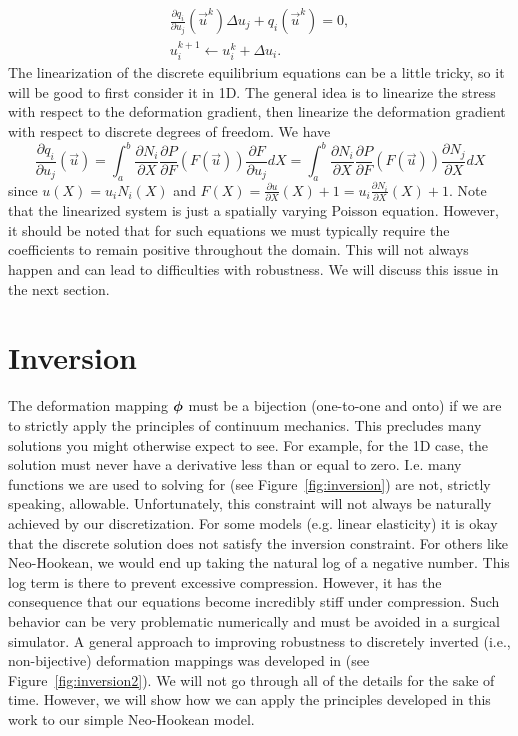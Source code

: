 \begin{gather*}
\frac{\partial q_i}{\partial u_j} \left( \vec{u}^k \right) \Delta{u}_j + q_i \left( \vec{u}^k \right) = 0, \\
u_i^{k+1} \leftarrow u_i^{k} + \Delta{u}_i.
\end{gather*}
The linearization of the discrete equilibrium equations can be a little tricky, so it will be good to first consider it in 1D. The general idea is to linearize the stress with respect to the deformation gradient, then linearize the deformation gradient with respect to discrete degrees of freedom. We have
\begin{equation*}
\frac{\partial q_i}{\partial u_j} \left( \vec{u} \right) = \int_a^b \frac{\partial N_i}{\partial X} \frac{\partial P}{\partial F} \left( F \left( \vec{u} \right) \right) \frac{\partial F}{\partial u_j} dX = \int_a^b \frac{\partial N_i}{\partial X} \frac{\partial P}{\partial F} \left( F \left( \vec{u} \right) \right) \frac{\partial N_j}{\partial X} dX
\end{equation*}
since $u(X) = u_i N_i(X)$ and $F(X) = \frac{\partial u}{\partial X}(X) + 1 = u_i \frac{\partial N_i}{\partial X}(X) + 1$. Note that the linearized system is just a spatially varying Poisson equation. However, it should be noted that for such equations we must typically require the coefficients to remain positive throughout the domain. This will not always happen and can lead to difficulties with robustness. We will discuss this issue in the next section.

\section{Inversion}

The deformation mapping $\boldsymbol{\phi}$ must be a bijection (one-to-one and onto) if we are to strictly apply the principles of continuum mechanics. This precludes many solutions you might otherwise expect to see. For example, for the 1D case, the solution must never have a derivative less than or equal to zero. I.e. many functions we are used to solving for (see Figure~\ref{fig:inversion}) are not, strictly speaking, allowable. Unfortunately, this constraint will not always be naturally achieved by our discretization. For some models (e.g. linear elasticity) it is okay that the discrete solution does not satisfy the inversion constraint. For others like Neo-Hookean, we would end up taking the natural log of a negative number. This log term is there to prevent excessive compression. However, it has the consequence that our equations become incredibly stiff under compression. Such behavior can be very problematic numerically and must be avoided in a surgical simulator. A general approach to improving robustness to discretely inverted (i.e., non-bijective) deformation mappings was developed in \cite{Irving06} (see Figure~\ref{fig:inversion2}). We will not go through all of the details for the sake of time. However, we will show how we can apply the principles developed in this work to our simple Neo-Hookean model.

